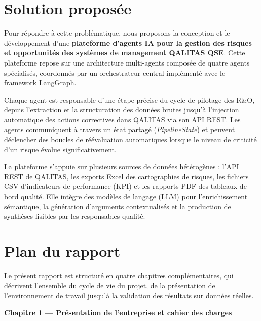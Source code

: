 \section*{Solution proposée}

Pour répondre à cette problématique, nous proposons la conception et le développement d'une \textbf{plateforme d'agents IA pour la gestion des risques et opportunités des systèmes de management QALITAS QSE}. Cette plateforme repose sur une architecture multi-agents composée de quatre agents spécialisés, coordonnés par un orchestrateur central implémenté avec le framework LangGraph.

Chaque agent est responsable d'une étape précise du cycle de pilotage des R\&O, depuis l'extraction et la structuration des données brutes jusqu'à l'injection automatique des actions correctives dans QALITAS via son API REST. Les agents communiquent à travers un état partagé (\textit{PipelineState}) et peuvent déclencher des boucles de réévaluation automatiques lorsque le niveau de criticité d'un risque évolue significativement.

La plateforme s'appuie sur plusieurs sources de données hétérogènes : l'API REST de QALITAS, les exports Excel des cartographies de risques, les fichiers CSV d'indicateurs de performance (KPI) et les rapports PDF des tableaux de bord qualité. Elle intègre des modèles de langage (LLM) pour l'enrichissement sémantique, la génération d'arguments contextualisés et la production de synthèses lisibles par les responsables qualité.

\section*{Plan du rapport}

Le présent rapport est structuré en quatre chapitres complémentaires, qui décrivent l'ensemble du cycle de vie du projet, de la présentation de l'environnement de travail jusqu'à la validation des résultats sur données réelles.

\vspace{0.8em}
\noindent\textbf{Chapitre 1 — Présentation de l'entreprise et cahier des charges}

